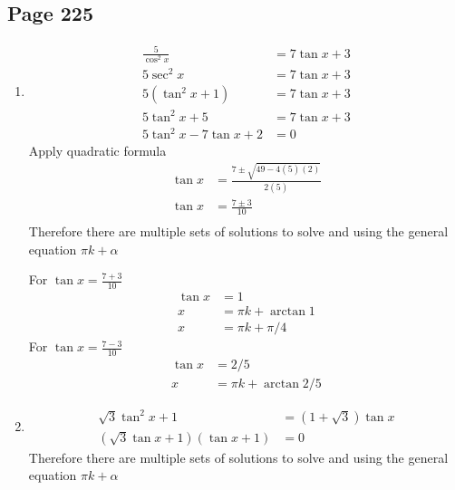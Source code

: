 \documentclass{article}
\newenvironment{solutions}[1]
{\subsection*{#1}
 \begin{enumerate}[leftmargin=1.5em]}
{\end{enumerate}}
\newcommand{\solution}{\item}
\begin{document}
\begin{solutions}{Page 225}
For $\tan x -1=0$
\begin{align*}
    \tan x - 1 &= 0\\
    \tan x =& 1\\
    x &= \pi k + \arctan 1\\
    x &= \pi k + \pi/4\\
\end{align*}

For $\tan^2 x + \tan x +1 =0$, apply quadratic formula
\begin{align*}
    \tan x &= \frac{-1 \pm \sqrt{1^2 - 4(1)(1)}}{2(1)}\\
    \tan x &= \frac{-1 \pm \sqrt{-3}}{2}
\end{align*}
Which does not have any solutiosn as the number inside the square root is negative
\solution
\begin{align*}
    \frac{5}{\cos^2 x} &= 7 \tan x +3\\
    5\sec^2 x &= 7 \tan x +3\\
    5(\tan^2 x + 1) &= 7 \tan x +3\\
    5\tan^2 x + 5 &= 7 \tan x +3\\
    5\tan^2 x -7\tan x + 2 &= 0
\end{align*}
Apply quadratic formula
\begin{align*}
    \tan x &= \frac{7\pm \sqrt{49-4(5)(2)}}{2(5)}\\
    \tan x &= \frac{7\pm 3}{10}\\
\end{align*}
Therefore there are multiple sets of solutions to solve and using the general equation $\pi k + \alpha$

For $\tan x = \frac{7+3}{10}$
\begin{align*}
    \tan x &= 1\\
    x &= \pi k + \arctan 1\\
    x &= \pi k + \pi/4
\end{align*}
For $\tan x = \frac{7-3}{10}$
\begin{align*}
    \tan x &= 2/5\\
    x &= \pi k + \arctan 2/5
\end{align*}
\solution
\begin{align*}
    \sqrt{3}\tan^2 x + 1 &= (1+\sqrt{3})\tan x\\
    (\sqrt{3}\tan x +1)(\tan x +1) &= 0
\end{align*}
Therefore there are multiple sets of solutions to solve and using the general equation $\pi k + \alpha$


\end{solutions}
\end{document}
